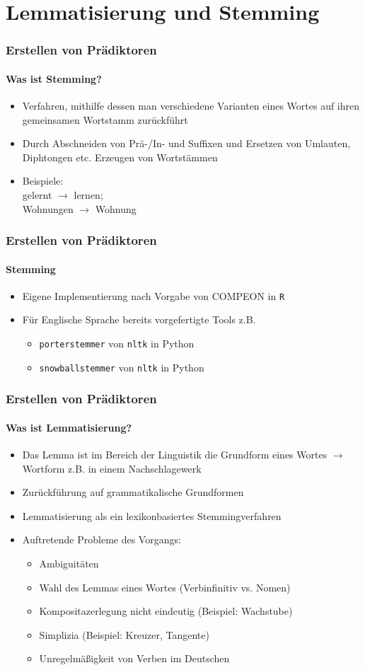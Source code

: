 \section{Lemmatisierung und Stemming}
\begin{frame}
\frametitle{Erstellen von Prädiktoren}
\framesubtitle{Was ist Stemming?}
\begin{itemize}\setlength\parskip{12pt}
	\item Verfahren, mithilfe dessen man verschiedene Varianten eines Wortes auf ihren gemeinsamen Wortstamm zurückführt
	\item Durch Abschneiden von Prä-/In- und Suffixen und Ersetzen von Umlauten, Diphtongen etc. Erzeugen von Wortstämmen
	\item Beispiele: \\
	gelernt $\rightarrow$ lernen; \\
	Wohnungen $\rightarrow$ Wohnung
\end{itemize}
\end{frame}

\begin{frame}
\frametitle{Erstellen von Prädiktoren}
\framesubtitle{Stemming}
\begin{itemize}\itemsep12pt
\item Eigene Implementierung nach Vorgabe von COMPEON in \texttt{R}
\item Für Englische Sprache bereits vorgefertigte Tools z.B. 
\begin{itemize}
\item \texttt{porterstemmer} von \texttt{nltk} in Python
\item \texttt{snowballstemmer} von \texttt{nltk} in Python
\end{itemize}
\end{itemize}
\end{frame}


\begin{frame}
\frametitle{Erstellen von Prädiktoren}
\framesubtitle{Was ist Lemmatisierung?}
\begin{itemize}
\item Das Lemma ist im Bereich der Linguistik die Grundform eines Wortes $\rightarrow$ Wortform z.B. in einem Nachschlagewerk
\item Zurückführung auf grammatikalische Grundformen
\item Lemmatisierung als ein lexikonbasiertes Stemmingverfahren
\item Auftretende Probleme des Vorgangs:
\begin{itemize}
\item Ambiguitäten
\item Wahl des Lemmas eines Wortes (Verbinfinitiv vs. Nomen)
\item Kompositazerlegung nicht eindeutig (Beispiel: Wachstube)
\item Simplizia (Beispiel: Kreuzer, Tangente)
\item Unregelmäßigkeit von Verben im Deutschen
\end{itemize}
\end{itemize}
\end{frame}

